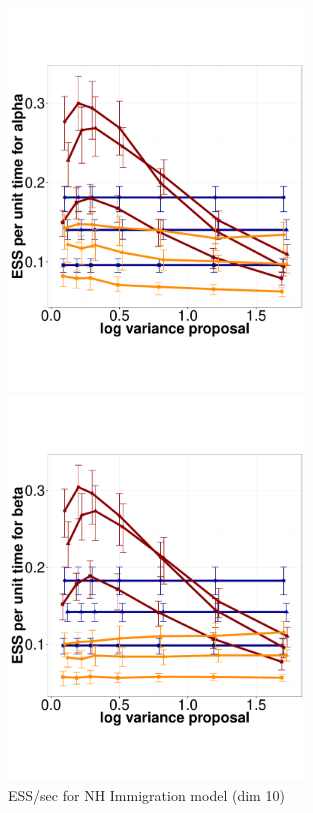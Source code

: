   \begin{figure}%
  \centering
  \begin{minipage}[!hp]{0.45\linewidth}
  \centering
    \includegraphics [width=0.70\textwidth, angle=0]{figs/pc_10_alpha.pdf}
      \end{minipage}
  \begin{minipage}[!hp]{0.45\linewidth}
  \centering
    \includegraphics [width=0.70\textwidth, angle=0]{figs/pc_10_beta.pdf}
    \vspace{-0 in}
  \end{minipage}
     \label{fig:ESS_pc_10}
    \caption{ESS/sec for NH Immigration model (dim 10)}
  \end{figure}


